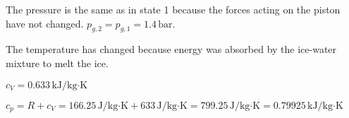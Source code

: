 The pressure is the same as in state 1 because the forces acting on the piston have not changed. \( p_{g,2} = p_{g,1} = 1.4 \, \text{bar} \).  

The temperature has changed because energy was absorbed by the ice-water mixture to melt the ice.  

\( c_V = 0.633 \, \text{kJ/kg·K} \)  

\( c_p = R + c_V = 166.25 \, \text{J/kg·K} + 633 \, \text{J/kg·K} = 799.25 \, \text{J/kg·K} = 0.79925 \, \text{kJ/kg·K} \)